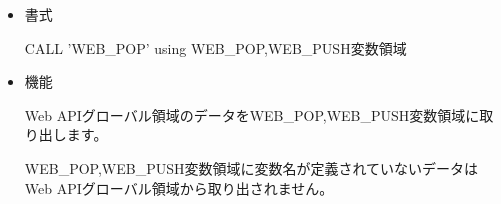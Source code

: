 
\begin{itemize}
\item{書式}

CALL 'WEB\_POP' using WEB\_POP,WEB\_PUSH変数領域

\item{機能}

Web APIグローバル領域のデータをWEB\_POP,WEB\_PUSH変数領域に取り出します。

\vspace{1em}

WEB\_POP,WEB\_PUSH変数領域に変数名が定義されていないデータはWeb APIグローバル領域から取り出されません。

\end{itemize}
